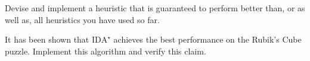 \documentclass[a4paper]{article}
\begin{document}
{\ex{}\label{ex:ex9} Devise and implement a heuristic that is guaranteed to perform better than, or as well as, all heuristics you have used so far.\vspace{0.1cm}}

{\ex{}\label{ex:ex10} It has been shown that $\text{IDA}^\star$ achieves the best performance on the Rubik's Cube puzzle.  Implement this algorithm and verify this claim.\vspace{0.1cm}}

%
%
\end{document}
